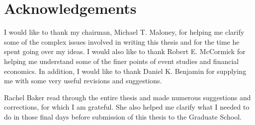 \chapter*{Acknowledgements} 

I would like to thank my chairman, Michael T. Maloney, for helping me clarify some of the complex issues involved in writing this thesis and for the time he spent going over my ideas. I would also like to thank Robert E. McCormick for helping me understand some of the finer points of event studies and financial economics. In addition, I would like to thank Daniel K. Benjamin for supplying me with some very useful revisions and suggestions.

Rachel Baker read through the entire thesis and made numerous suggestions and corrections, for which I am grateful. She also helped me clarify what I needed to do in those final days before submission of this thesis to the Graduate School.
